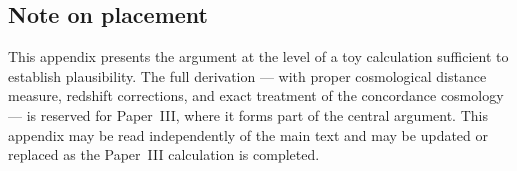 \documentclass[12pt]{article}
\begin{document}
\subsection*{Note on placement}

This appendix presents the argument at the level of a toy calculation
sufficient to establish plausibility.
The full derivation --- with proper cosmological distance measure,
redshift corrections, and exact treatment of the concordance cosmology
--- is reserved for Paper~III, where it forms part of the central
argument.
This appendix may be read independently of the main text and may be
updated or replaced as the Paper~III calculation is completed.
\end{document}
